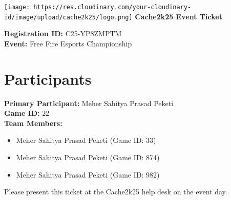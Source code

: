 \documentclass[a4paper]{article}
\begin{document}
\pagestyle{empty}

\begin{center}
    \texttt{[image: https://res.cloudinary.com/your-cloudinary-id/image/upload/cache2k25/logo.png]}
    \vspace{10pt}
    \textbf{\Huge \color{titleblue} Cache2k25 Event Ticket}
\end{center}

\vspace{20pt}

\begin{center}
    \Large \textbf{Registration ID:} C25-YP8ZMPTM \\
    \vspace{10pt}
    \large \textbf{Event:} Free Fire Esports Championship \\
    \vspace{10pt}
\end{center}

\section*{Participants}
\textbf{Primary Participant:} Meher Sahitya Prasad Peketi \\
\textbf{Game ID:} 22 \\

\vspace{10pt}
\textbf{Team Members:}
\begin{itemize}
    \item Meher Sahitya Prasad Peketi (Game ID: 33)
    \item Meher Sahitya Prasad Peketi (Game ID: 874)
    \item Meher Sahitya Prasad Peketi (Game ID: 982)
\end{itemize}


\vspace{20pt}

\begin{center}
    \small \color{headergray} Please present this ticket at the Cache2k25 help desk on the event day.
\end{center}
\end{document}
